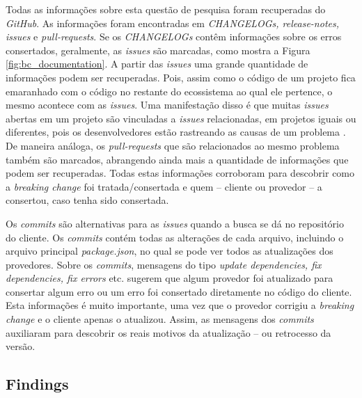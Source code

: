 Todas as informações sobre esta questão de pesquisa foram recuperadas do \textit{GitHub}. As informações foram encontradas em \textit{CHANGELOGs, release-notes, issues} e \textit{pull-requests}. Se os \textit{CHANGELOGs} contêm informações sobre os erros consertados, geralmente, as \textit{issues} são marcadas, como mostra a Figura \ref{fig:bc_documentation}. A partir das \textit{issues} uma grande quantidade de informações podem ser recuperadas. Pois, assim como o código de um projeto fica emaranhado com o código no restante do ecossistema ao qual ele pertence, o mesmo acontece com as \textit{issues}. Uma manifestação disso é que muitas \textit{issues} abertas em um projeto são vinculadas a \textit{issues} relacionadas, em projetos iguais ou diferentes, pois os desenvolvedores estão rastreando as causas de um problema \cite{Zhang:2018:WIL:3242887.3242891}. De maneira análoga, os \textit{pull-requests} que são relacionados ao mesmo problema também são marcados, abrangendo ainda mais a quantidade de informações que podem ser recuperadas. Todas estas informações corroboram para descobrir como a \textit{breaking change} foi tratada/consertada e quem -- cliente ou provedor -- a consertou, caso tenha sido consertada.

Os \textit{commits} são alternativas para as \textit{issues} quando a busca se dá no repositório do cliente. Os \textit{commits} contém todas as alterações de cada arquivo, incluindo o arquivo principal \textit{package.json}, no qual se pode ver todos as atualizações dos provedores. Sobre os \textit{commits}, mensagens do tipo \textit{update dependencies, fix dependencies, fix errors} etc. sugerem que algum provedor foi atualizado para consertar algum erro ou um erro foi consertado diretamente no código do cliente. Esta informações é muito importante, uma vez que o provedor corrigiu a \textit{breaking change} e o cliente apenas o atualizou. Assim, as mensagens dos \textit{commits} auxiliaram para descobrir os reais motivos da atualização -- ou retrocesso da versão.

\subsection{Findings}
\label{fin:rq3}
